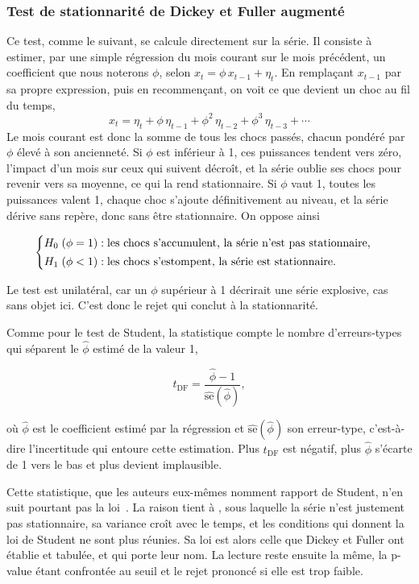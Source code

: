 \subsubsection*{Test de stationnarité de Dickey et Fuller augmenté}

Ce test, comme le suivant, se calcule directement sur la série. Il consiste à
estimer, par une simple régression du mois courant sur le mois précédent, un
coefficient que nous noterons \(\phi\), selon
\(x_t = \phi\, x_{t-1} + \eta_t\).
En remplaçant \(x_{t-1}\) par sa propre expression, puis en recommençant, on
voit ce que devient un choc au fil du temps,
\[
  x_t = \eta_t + \phi\,\eta_{t-1} + \phi^2\,\eta_{t-2} + \phi^3\,\eta_{t-3} + \cdots
\]
Le mois courant est donc la somme de tous les chocs passés, chacun pondéré par
\(\phi\) élevé à son ancienneté. Si \(\phi\) est inférieur à 1, ces puissances
tendent vers zéro, l'impact d'un mois sur ceux qui suivent décroît, et la série
oublie ses chocs pour revenir vers sa moyenne, ce qui la rend stationnaire. Si
\(\phi\) vaut 1, toutes les puissances valent 1, chaque choc s'ajoute
définitivement au niveau, et la série dérive sans repère, donc sans être
stationnaire. On oppose ainsi

\[
  \begin{cases}
    H_0 \;(\phi = 1) : \text{les chocs s'accumulent, la série n'est pas stationnaire,}\\[2pt]
    H_1 \;(\phi < 1) : \text{les chocs s'estompent, la série est stationnaire.}
  \end{cases}
\]

Le test est unilatéral, car un \(\phi\) supérieur à 1 décrirait une série
explosive, cas sans objet ici. C'est donc le rejet qui conclut à la
stationnarité.

Comme pour le test de Student, la statistique compte le nombre d'erreurs-types
qui séparent le \(\hat\phi\) estimé de la valeur 1,

\[
  t_{\mathrm{DF}} = \frac{\hat\phi - 1}{\widehat{\mathrm{se}}(\hat\phi)},
\]


où \(\hat\phi\) est le coefficient estimé par la régression et
\(\widehat{\mathrm{se}}(\hat\phi)\) son erreur-type, c'est-à-dire
l'incertitude qui entoure cette estimation. Plus \(t_{\mathrm{DF}}\) est
négatif, plus \(\hat\phi\) s'écarte de 1 vers le bas et plus \Hzero{} devient
implausible.

Cette statistique, que les auteurs eux-mêmes nomment rapport de Student, n'en
suit pourtant pas la loi~\cite{dickeyfuller1979}. La raison tient à \Hzero{},
sous laquelle la série n'est justement pas stationnaire, sa variance croît avec
le temps, et les conditions qui donnent la loi de Student ne sont plus réunies.
Sa loi est alors celle que Dickey et Fuller ont établie et tabulée, et qui
porte leur nom. La lecture reste ensuite la même, la p-value étant confrontée
au seuil et le rejet prononcé si elle est trop faible.

